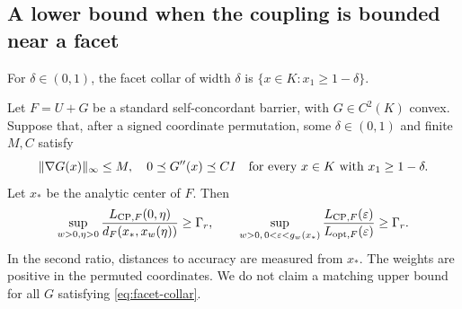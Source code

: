 \subsection{A lower bound when the coupling is bounded near a facet}
For $\delta\in(0,1)$, the facet collar of width $\delta$ is
$\{x\in K:x_1\geq1-\delta\}$.
\begin{theorem}
\label{thm:facet-coupling}
Let $F=U+G$ be a standard self-concordant barrier, with $G\in C^2(K)$
convex. Suppose that, after a signed coordinate permutation, some
$\delta\in(0,1)$ and finite $M,C$ satisfy
\begin{equation}
 \lVert \nabla G(x)\rVert_\infty\leq M,\quad
 0\preceq G''(x)\preceq CI
 \quad\text{for every }x\in K\text{ with }x_1\geq1-\delta.
 \label{eq:facet-collar}
\end{equation}
Let $x_*$ be the analytic center of $F$. Then
\begin{equation}
 \sup_{w>0,\eta>0}
 \frac{L_{\mathrm{CP},F}(0,\eta)}{d_F(x_*,x_w(\eta))}\geq\Gamma_r,
 \qquad
 \sup_{w>0,\,0<\varepsilon<g_w(x_*)}
 \frac{L_{\mathrm{CP},F}(\varepsilon)}{L_{\mathrm{opt},F}(\varepsilon)}\geq\Gamma_r.
 \label{eq:facet-tax}
\end{equation}
In the second ratio, distances to accuracy are measured from $x_*$.
The weights are positive in the permuted coordinates. We do not claim a matching upper bound
for all $G$ satisfying \eqref{eq:facet-collar}.
\end{theorem}
